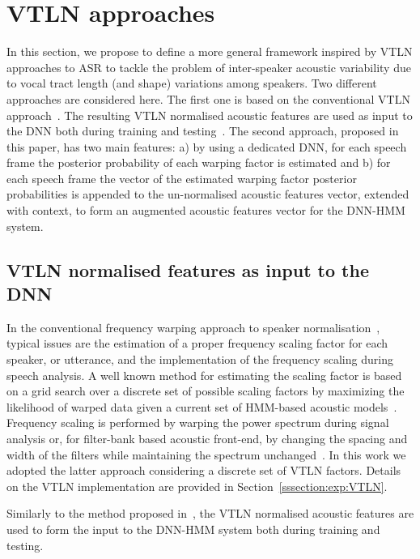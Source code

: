 \documentclass{nle}
\begin{document}
\section{VTLN approaches}\label{section:VTLN}
In this section, we propose to define a more general framework inspired by VTLN approaches to ASR to tackle the problem of inter-speaker acoustic variability due to
vocal tract  length (and shape)  variations among speakers. Two different approaches are considered here. The  first  one  is  based  on  the
conventional   VTLN  approach~\citep{EidGis96,LeeRos96,WegMcaOrlPek96}.
The resulting VTLN  normalised acoustic features are used  as input to
the  DNN both during  training and  testing~\citep{seide11}.  The
second approach, proposed in this  paper, has two main features: a) by
using a dedicated DNN, for each speech frame the posterior probability
of each warping  factor is estimated and b) for  each speech frame the
vector  of the  estimated  warping factor  posterior probabilities  is
appended to  the un-normalised acoustic features  vector, extended with
context, to form an augmented  acoustic features vector for the DNN-HMM
system.

\subsection{VTLN normalised features as input to the DNN}
In   the   conventional   frequency   warping  approach   to   speaker
normalisation~\citep{EidGis96,LeeRos96,WegMcaOrlPek96},  typical issues
are  the estimation  of a  proper  frequency scaling  factor for  each
speaker, or utterance, and the implementation of the frequency scaling
during  speech  analysis.  A  well  known  method  for estimating  the
scaling  factor is  based on  a  grid search  over a  discrete set  of
possible scaling  factors by maximizing the likelihood  of warped data
given  a  current set  of  HMM-based acoustic  models~\citep{LeeRos96}.
Frequency scaling  is performed by  warping the power  spectrum during
signal  analysis  or, for  filter-bank  based  acoustic front-end,  by
changing the  spacing and width  of the filters while  maintaining the
spectrum  unchanged~\citep{LeeRos96}.   In  this  work we  adopted  the
latter approach considering a discrete set of VTLN factors. Details on the VTLN implementation  are provided in
Section~\ref{sssection:exp:VTLN}.

Similarly to the method proposed in~\citet{seide11}, the VTLN normalised
acoustic features are used to form the input to the DNN-HMM system both
during training and testing.
\end{document}
